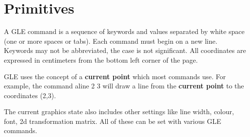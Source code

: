 \chapter{Primitives}
\label{prim:chap}

A GLE command is a sequence of keywords and values separated by white space
(one or more spaces or tabs).  Each command must begin on a new line. Keywords
may not be abbreviated, the case is not significant.  All coordinates are
expressed in centimeters from the bottom left corner of the page.

GLE uses the concept of a {\bf current point} which most commands use.
For example, the command {\sf aline 2 3} will draw a line from the
{\bf current point} to the coordinates (2,3).

The current graphics state also includes other settings like
line width, colour, font, 2d transformation matrix.  All of these
can be set with various GLE commands.

